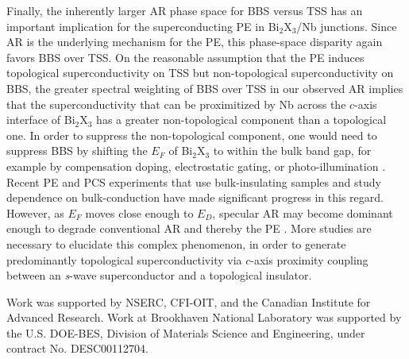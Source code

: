 \documentclass[aps,prl,twocolumn,showpacs,amsmath,amssymb,superscriptaddress,citeautoscript]{revtex4-1}
\begin{document}
Finally, the inherently larger AR phase space for BBS versus TSS has an important implication for the superconducting PE in Bi$_{2}$X$_{3}$/Nb junctions.  Since AR is the underlying mechanism for the PE, this phase-space disparity again favors BBS over TSS.  On the reasonable assumption that the PE induces topological superconductivity on TSS but non-topological superconductivity on BBS, the greater spectral weighting of BBS over TSS in our observed AR implies that the superconductivity that can be proximitized by Nb across the $c$-axis interface of Bi$_{2}$X$_{3}$ has a greater non-topological component than a topological one. In order to suppress the non-topological component, one would need to suppress BBS by shifting the $E_F$ of Bi$_{2}$X$_{3}$ to within the bulk band gap, for example by compensation doping, electrostatic gating, or photo-illumination \cite{Ando2013,Chang2015,Chen2010,Frantzeskakis2015}. Recent PE and PCS experiments that use bulk-insulating samples \cite{Borisov2016,Stehno2017,Sun2016} and study dependence on bulk-conduction \cite{Xu2015,Stehno2016,Jauregui2017,Shvetsov2017,Wiedenmann2017} have made significant progress in this regard.  However, as $E_F$ moves close enough to $E_D$, specular AR may become dominant enough to degrade conventional AR \cite{Beenakker2006,Linder2008} and thereby the PE \cite{Komatsu2012}.  More studies are necessary to elucidate this complex phenomenon, in order to generate predominantly topological superconductivity via $c$-axis proximity coupling between an \textit{s}-wave superconductor and a topological insulator.

Work was supported by NSERC, CFI-OIT, and the Canadian Institute for Advanced Research. Work at Brookhaven National Laboratory was supported by the U.S. DOE-BES, Division of Materials Science and Engineering, under contract No. DESC00112704.


\end{document}
